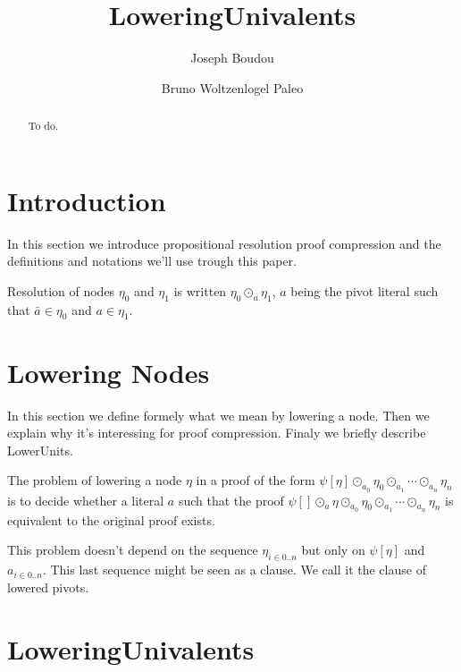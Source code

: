 \documentclass{llncs}
\title{LoweringUnivalents}
\author{Joseph Boudou \and Bruno Woltzenlogel Paleo}
\institute{Vienna University of Technology, Austria}
\newenvironment{jogo}{\color{teal}}{}
\begin{document}
\maketitle

\begin{abstract}
\begin{jogo}
  To do.
\end{jogo}
\end{abstract}

\section{Introduction}

\begin{jogo}
In this section we introduce propositional resolution proof compression and the
definitions and notations we'll use trough this paper.
\end{jogo}

\begin{notation}[Resolution]
Resolution of nodes $\eta_0$ and $\eta_1$ is written $\eta_0 \odot_a
\eta_1$, $a$ being the pivot literal such that $\bar{a} \in \eta_0$ and $a
\in \eta_1$.
\end{notation}

\section{Lowering Nodes}

\begin{jogo}
In this section we define formely what we mean by lowering a node. Then we explain why it's interessing for proof compression. Finaly we briefly describe LowerUnits.
\end{jogo}

The problem of lowering a node $\eta$ in a proof of the form $\psi[\eta]
\odot_{a_0} \eta_0 \odot_{a_1} \cdots \odot_{a_n} \eta_n$ is to decide
whether a literal $a$ such that the proof $\psi[] \odot_a \eta
\odot_{a_0} \eta_0 \odot_{a_1} \cdots \odot_{a_n} \eta_n$ is equivalent to
the original proof exists.

This problem doesn't depend on the sequence $\eta_{i \in 0..n}$ but only on
$\psi[\eta]$ and $a_{i \in 0..n}$. This last sequence might be seen as a
clause. We call it the clause of lowered pivots.

\section{LoweringUnivalents}
\end{document}
